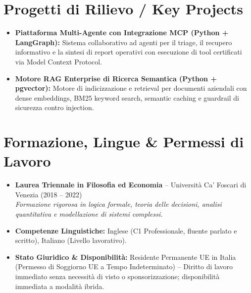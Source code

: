 \documentclass[a4paper,10pt]{article}
\begin{document}
\section{Progetti di Rilievo / Key Projects}
\begin{itemize}
  \item \textbf{Piattaforma Multi-Agente con Integrazione MCP (Python + LangGraph):} Sistema collaborativo ad agenti per il triage, il recupero informativo e la sintesi di report operativi con esecuzione di tool certificati via Model Context Protocol.
  \item \textbf{Motore RAG Enterprise di Ricerca Semantica (Python + pgvector):} Motore di indicizzazione e retrieval per documenti aziendali con dense embeddings, BM25 keyword search, semantic caching e guardrail di sicurezza contro injection.
\end{itemize}

\section{Formazione, Lingue \& Permessi di Lavoro}
\begin{itemize}
  \item \textbf{Laurea Triennale in Filosofia ed Economia} -- Università Ca' Foscari di Venezia (2018 -- 2022) \\
  \textit{Formazione rigorosa in logica formale, teoria delle decisioni, analisi quantitativa e modellazione di sistemi complessi.}
  \item \textbf{Competenze Linguistiche:} Inglese (C1 Professionale, fluente parlato e scritto), Italiano (Livello lavorativo).
  \item \textbf{Stato Giuridico \& Disponibilità:} Residente Permanente UE in Italia (Permesso di Soggiorno UE a Tempo Indeterminato) -- Diritto di lavoro immediato senza necessità di visto o sponsorizzazione; disponibilità immediata a modalità ibrida.
\end{itemize}
\end{document}
